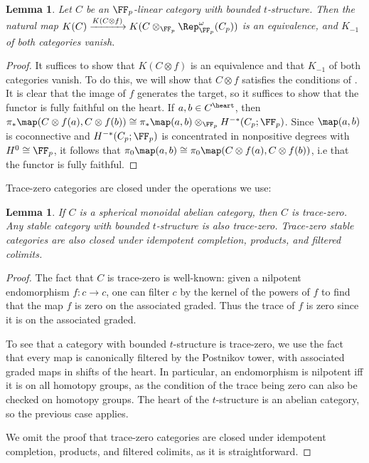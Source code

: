 \documentclass[12pt,oneside]{article}
\newcounter{counter}
\newtheorem{lem}[counter]{Lemma}
\begin{document}
\begin{lem}\label{lem:dev}
	Let $C$ be an $\FF_p$-linear category with bounded $t$-structure. Then the natural map $K(C) \xrightarrow{K(C\otimes f)} K(C\otimes_{\FF_p}\Rep_{\FF_p}^{\omega}(C_p))$ is an equivalence, and $K_{-1}$ of both categories vanish.
\end{lem}
\begin{proof}
	It suffices to show that $K(C\otimes f)$ is an equivalence and that $K_{-1}$ of both categories vanish. To do this, we will show that $C\otimes f$ satisfies the conditions of \cite[Theorem 1.3]{kcoconn}. It is clear that the image of $f$ generates the target, so it suffices to show that the functor is fully faithful on the heart. If $a,b\in C^{\heart}$, then $\pi_*\map(C\otimes f(a), C\otimes f(b)) \cong \pi_*\map(a,b)\otimes_{\FF_p}H^{-*}(C_p;\FF_p)$. Since $\map(a,b)$ is coconnective and $H^{-*}(C_p;\FF_p)$ is concentrated in nonpositive degrees with $H^0 \cong \FF_p$, it follows that $\pi_0\map(a,b) \cong \pi_0\map(C\otimes f(a),C\otimes f(b))$, i.e that the functor is fully faithful.
\end{proof}

Trace-zero categories are closed under the operations we use:

\begin{lem}\label{lem:trzeroquot}
	If $C$ is a spherical monoidal abelian category, then $C$ is trace-zero. Any stable category with bounded $t$-structure is also trace-zero. Trace-zero stable categories are also closed under idempotent completion, products, and filtered colimits.
\end{lem}

\begin{proof}
	The fact that $C$ is trace-zero is well-known: given a nilpotent endomorphism $f:c \to c$, one can filter $c$ by the kernel of the powers of $f$ to find that the map $f$ is zero on the associated graded. Thus the trace of $f$ is zero since it is on the associated graded.
	
	To see that a category with bounded $t$-structure is trace-zero, we use the fact that every map is canonically filtered by the Postnikov tower, with associated graded maps in shifts of the heart. In particular, an endomorphism is nilpotent iff it is on all homotopy groups, as the condition of the trace being zero can also be checked on homotopy groups. The heart of the $t$-structure is an abelian category, so the previous case applies.
	 
	 We omit the proof that trace-zero categories are closed under idempotent completion, products, and filtered colimits, as it is straightforward.
\end{proof}
\end{document}
